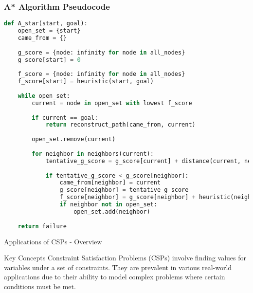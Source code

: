 \documentclass[aspectratio=169]{beamer}
\begin{document}
\begin{frame}[fragile]
    \frametitle{A* Algorithm Pseudocode}
    \begin{lstlisting}[language=Python]
def A_star(start, goal):
    open_set = {start}
    came_from = {}
    
    g_score = {node: infinity for node in all_nodes}
    g_score[start] = 0
    
    f_score = {node: infinity for node in all_nodes}
    f_score[start] = heuristic(start, goal)
    
    while open_set:
        current = node in open_set with lowest f_score
        
        if current == goal:
            return reconstruct_path(came_from, current)
        
        open_set.remove(current)
        
        for neighbor in neighbors(current):
            tentative_g_score = g_score[current] + distance(current, neighbor)
            
            if tentative_g_score < g_score[neighbor]:
                came_from[neighbor] = current
                g_score[neighbor] = tentative_g_score
                f_score[neighbor] = g_score[neighbor] + heuristic(neighbor, goal)
                if neighbor not in open_set:
                    open_set.add(neighbor)
    
    return failure
    \end{lstlisting}
\end{frame}

\begin{frame}[fragile]{Applications of CSPs - Overview}
    \begin{block}{Key Concepts}
        Constraint Satisfaction Problems (CSPs) involve finding values for variables under a set of constraints. They are prevalent in various real-world applications due to their ability to model complex problems where certain conditions must be met.
    \end{block}
\end{frame}
\end{document}
